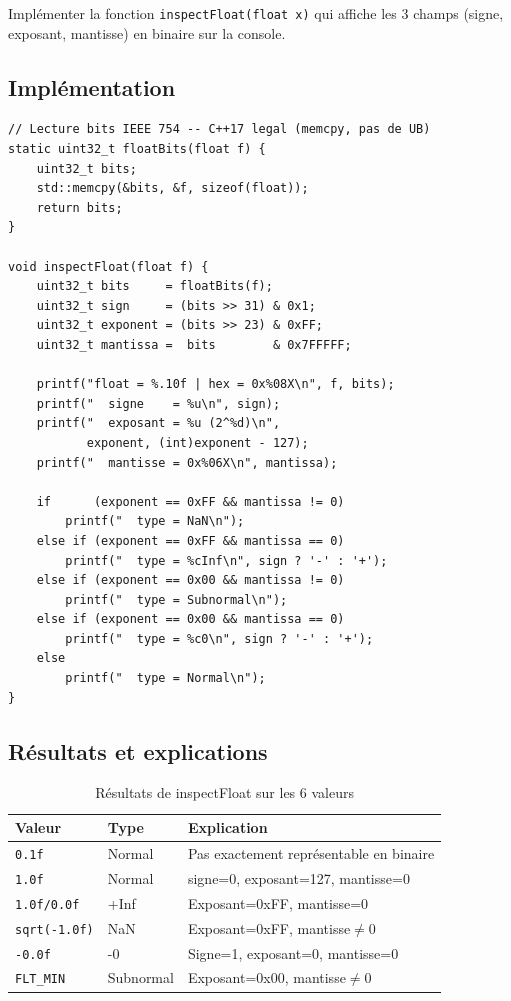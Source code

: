 \documentclass[12pt,a4paper]{report}
\begin{document}
Implémenter la fonction \texttt{inspectFloat(float x)} qui affiche les
3 champs (signe, exposant, mantisse) en binaire sur la console.

\subsection{Implémentation}

\begin{lstlisting}[caption={Float.cpp --- inspectFloat}]
// Lecture bits IEEE 754 -- C++17 legal (memcpy, pas de UB)
static uint32_t floatBits(float f) {
    uint32_t bits;
    std::memcpy(&bits, &f, sizeof(float));
    return bits;
}

void inspectFloat(float f) {
    uint32_t bits     = floatBits(f);
    uint32_t sign     = (bits >> 31) & 0x1;
    uint32_t exponent = (bits >> 23) & 0xFF;
    uint32_t mantissa =  bits        & 0x7FFFFF;

    printf("float = %.10f | hex = 0x%08X\n", f, bits);
    printf("  signe    = %u\n", sign);
    printf("  exposant = %u (2^%d)\n",
           exponent, (int)exponent - 127);
    printf("  mantisse = 0x%06X\n", mantissa);

    if      (exponent == 0xFF && mantissa != 0)
        printf("  type = NaN\n");
    else if (exponent == 0xFF && mantissa == 0)
        printf("  type = %cInf\n", sign ? '-' : '+');
    else if (exponent == 0x00 && mantissa != 0)
        printf("  type = Subnormal\n");
    else if (exponent == 0x00 && mantissa == 0)
        printf("  type = %c0\n", sign ? '-' : '+');
    else
        printf("  type = Normal\n");
}
\end{lstlisting}

\subsection{Résultats et explications}

\begin{table}[H]
    \centering
    \begin{tabular}{|l|l|p{6cm}|}
        \hline
        \textbf{Valeur} & \textbf{Type} & \textbf{Explication} \\
        \hline
        \texttt{0.1f}   & Normal    & Pas exactement représentable en binaire \\
        \texttt{1.0f}   & Normal    & signe=0, exposant=127, mantisse=0 \\
        \texttt{1.0f/0.0f} & +Inf  & Exposant=0xFF, mantisse=0 \\
        \texttt{sqrt(-1.0f)} & NaN  & Exposant=0xFF, mantisse$\neq$0 \\
        \texttt{-0.0f}  & -0        & Signe=1, exposant=0, mantisse=0 \\
        \texttt{FLT\_MIN} & Subnormal & Exposant=0x00, mantisse$\neq$0 \\
        \hline
    \end{tabular}
    \caption{Résultats de inspectFloat sur les 6 valeurs}
\end{table}
\end{document}
